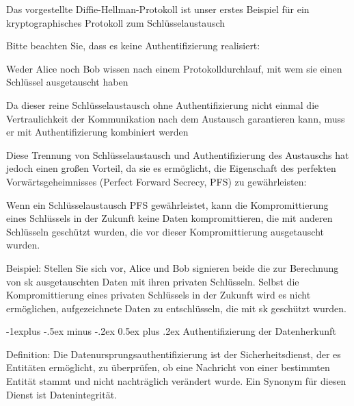 \documentclass[a4paper]{article}
\makeatletter
\renewcommand{\subsection}{\@startsection{subsection}{2}{0mm}%
 {-1explus -.5ex minus -.2ex}%
 {0.5ex plus .2ex}%
 {\normalfont\normalsize\bfseries}}
\makeatother
\begin{document}
\begin{multicols}{3}
      \begin{itemize*}
            \item Das vorgestellte Diffie-Hellman-Protokoll ist unser erstes Beispiel
            für ein kryptographisches Protokoll zum Schlüsselaustausch
            \item Bitte beachten Sie, dass es keine Authentifizierung realisiert:
            \begin{itemize*}
                  \item Weder Alice noch Bob wissen nach einem Protokolldurchlauf, mit wem sie einen Schlüssel ausgetauscht haben
                  \item Da dieser reine Schlüsselaustausch ohne Authentifizierung nicht einmal die Vertraulichkeit der Kommunikation nach dem Austausch garantieren kann, muss er mit Authentifizierung kombiniert werden
            \end{itemize*}
            \item Diese Trennung von Schlüsselaustausch und Authentifizierung des
            Austauschs hat jedoch einen großen Vorteil, da sie es ermöglicht, die
            Eigenschaft des perfekten Vorwärtsgeheimnisses (Perfect Forward
            Secrecy, PFS) zu gewährleisten:
            \begin{itemize*}
                  \item Wenn ein Schlüsselaustausch PFS gewährleistet, kann die Kompromittierung eines Schlüssels in der Zukunft keine Daten kompromittieren, die mit anderen Schlüsseln geschützt wurden, die vor dieser Kompromittierung ausgetauscht wurden.
                  \item Beispiel: Stellen Sie sich vor, Alice und Bob signieren beide die zur Berechnung von sk ausgetauschten Daten mit ihren privaten Schlüsseln. Selbst die Kompromittierung eines privaten Schlüssels in der Zukunft wird es nicht ermöglichen, aufgezeichnete Daten zu entschlüsseln, die mit sk geschützt wurden.
            \end{itemize*}
      \end{itemize*}


      \subsection{Authentifizierung der
            Datenherkunft}

      Definition: Die Datenursprungsauthentifizierung ist der
      Sicherheitsdienst, der es Entitäten ermöglicht, zu überprüfen, ob eine
      Nachricht von einer bestimmten Entität stammt und nicht nachträglich
      verändert wurde. Ein Synonym für diesen Dienst ist Datenintegrität.


\end{multicols}
\end{document}
